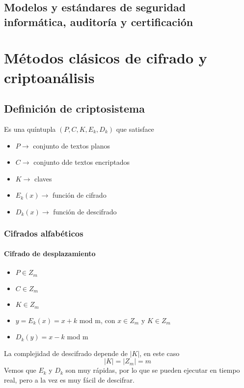 \section{Modelos y estándares de seguridad informática, auditoría y certificación}

\chapter{Métodos clásicos de cifrado y criptoanálisis}
\section{Definición de criptosistema}
\begin{defn}[Criptosistema]
	Es una quíntupla $(P, C, K, E_k, D_k)$ que satisface
	
\begin{itemize}
	\item $P \rightarrow$ conjunto de textos planos
	\item $C \rightarrow$ conjunto dde textos encriptados
	\item $K \rightarrow$ claves
	\item $E_k(x) \rightarrow$ función de cifrado
	\item $D_k(x) \rightarrow$ función de descifrado
\end{itemize}

\end{defn}
\subsection{Cifrados alfabéticos}
\subsubsection{Cifrado de desplazamiento}

\begin{itemize}
	\item $P\in Z_m$
	\item $C\in Z_m$
	\item $K\in Z_m$
	\item $y=E_k(x)= x+k$ mod m, con $x\in Z_m$ y $K \in Z_m$
	\item $D_k(y) = x- k$ mod m
	
\end{itemize}

La complejidad de descifrado depende de $|K|$, en este caso
$$|K| = |Z_m| = m$$
Vemos que $E_k$ y $D_k$ son muy rápidas, por lo que se pueden ejecutar en tiempo real, pero a la vez es muy fácil de descifrar.

